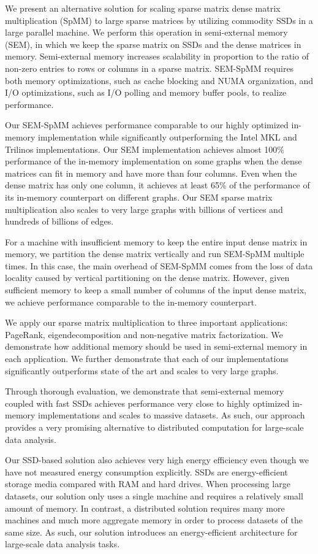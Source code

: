 We present an alternative solution for scaling sparse matrix dense matrix
multiplication (SpMM) to large sparse matrices by utilizing commodity SSDs
in a large parallel machine. We perform this operation in semi-external memory
(SEM), in which
we keep the sparse matrix on SSDs and the dense matrices in memory. Semi-external
memory increases scalability in proportion to the ratio of non-zero entries
to rows or columns in a sparse matrix. SEM-SpMM requires both memory optimizations,
such as cache blocking and NUMA organization, and I/O optimizations, such as I/O
polling and memory buffer pools, to realize performance.

Our SEM-SpMM achieves performance comparable to our highly optimized in-memory
implementation while significantly outperforming the Intel MKL and
Trilinos implementations. Our SEM implementation achieves almost 100\% performance
of the in-memory implementation on some graphs when the dense matrices can fit
in memory and have more than four columns. Even when the dense matrix has only
one column, it achieves at least 65\% of the performance of its in-memory counterpart
on different graphs. Our SEM sparse matrix multiplication also scales to very
large graphs with billions of vertices and hundreds of billions of edges.

For a machine with insufficient memory to keep the entire input dense matrix
in memory, we partition the dense matrix vertically and run SEM-SpMM multiple
times. In this case, the main overhead of SEM-SpMM comes from the loss of
data locality caused by vertical partitioning on the dense matrix. However,
given sufficient memory to keep a small number of columns of the input dense
matrix, we achieve performance comparable to the in-memory counterpart.

We apply our sparse matrix multiplication to three important applications:
PageRank, eigendecomposition and non-negative matrix factorization. We demonstrate
how additional memory should be used in semi-external memory in each application.
We further demonstrate that each of our implementations significantly outperforms
state of the art and scales to very large graphs.

Through thorough evaluation, we demonstrate that semi-external memory
coupled with fast SSDs achieves performance very close to highly optimized
in-memory implementations and scales to massive datasets.
As such, our approach provides a very promising alternative to distributed
computation for large-scale data analysis.

Our SSD-based solution also achieves very high energy efficiency even though
we have not measured energy consumption explicitly. SSDs are energy-efficient
storage media \cite{Tsirogiannis} compared with RAM and hard drives.
When processing large datasets, our solution only uses
a single machine and requires a relatively small amount of memory. In contrast,
a distributed solution requires many more machines and much more aggregate
memory in order to process datasets of the same size. As such, our solution
introduces an energy-efficient architecture for large-scale data analysis tasks.
